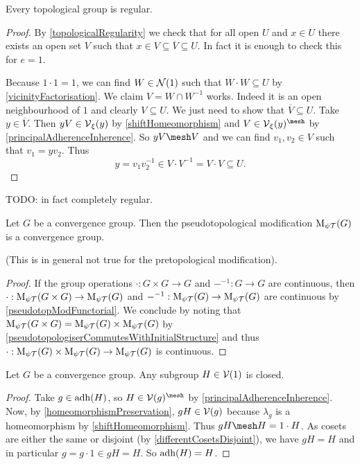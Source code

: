\begin{proposition} \label{topologicalGroupsRegular}
Every topological group is regular.
\end{proposition}
\begin{proof}
By \ref{topologicalRegularity} we check that for all open $U$ and $x\in U$ there exists an open set $V$ such that $x\in V\subseteq \overline{V}\subseteq U$. In fact it is enough to check this for $e = 1$.\

Because $1\cdot 1 = 1$, we can find $W\in\operatorname{\mathcal{N}}(1)$ such that $W\cdot W \subseteq U$ by \ref{vicinityFactorisation}. We claim $V= W\cap W^{-1}$ works. Indeed it is an open neighbourhood of $1$ and clearly $V\subseteq U$. We just need to show that $\overline{V}\subseteq U$. Take $y\in \overline{V}$. Then $yV\in \operatorname{\mathcal{V}}_\xi(y)$ by \ref{shiftHomeomorphism} and $V\in \vicinity_\xi(y)^{\mesh}$ by \ref{principalAdherenceInherence}. So $yV\mesh V$ and we can find $v_1,v_2\in V$ such that $v_1 = yv_2$. Thus
\[ y = v_1v_2^{-1} \in V\cdot V^{-1} = V\cdot V \subseteq U. \]
\end{proof}
TODO: in fact completely regular.

\begin{proposition}
Let $G$ be a convergence group. Then the pseudotopological modification $\operatorname{M_{\psi\mathcal{T}}}(G)$ is a convergence
group.
\end{proposition}
(This is in general not true for the pretopological modification).
\begin{proof}
If the group operations $\cdot: G\times G\to G$ and $-^{-1}: G\to G$ are continuous, then $\cdot: \operatorname{M_{\psi\mathcal{T}}}(G\times G)\to \operatorname{M_{\psi\mathcal{T}}}(G)$ and $-^{-1}: \operatorname{M_{\psi\mathcal{T}}}(G)\to \operatorname{M_{\psi\mathcal{T}}}(G)$ are continuous by \ref{pseudotopModFunctorial}. We conclude by noting that $\operatorname{M_{\psi\mathcal{T}}}(G\times G) = \operatorname{M_{\psi\mathcal{T}}}(G)\times \operatorname{M_{\psi\mathcal{T}}}(G)$ by \ref{pseudotopologiserCommutesWithInitialStructure} and thus $\cdot: \operatorname{M_{\psi\mathcal{T}}}(G)\times \operatorname{M_{\psi\mathcal{T}}}(G)\to \operatorname{M_{\psi\mathcal{T}}}(G)$ is continuous.
\end{proof}

\begin{proposition}
Let $G$ be a convergence group. Any subgroup $H\in\operatorname{\mathcal{V}}(1)$ is closed.
\end{proposition}
\begin{proof}
Take $g\in \operatorname{adh}(H)$, so $H\in \vicinity(g)^{\mesh}$ by \ref{principalAdherenceInherence}. Now, by \ref{homeomorphismPreservation}, $gH\in \operatorname{\mathcal{V}}(g)$ because $\lambda_g$ is a homeomorphism by \ref{shiftHomeomorphism}. Thus $gH \mesh H = 1\cdot H$. As cosets are either the same or disjoint (by \ref{differentCosetsDisjoint}), we have $gH = H$ and in particular $g = g\cdot 1 \in gH = H$. So $\operatorname{adh}(H) = H$.
\end{proof}

